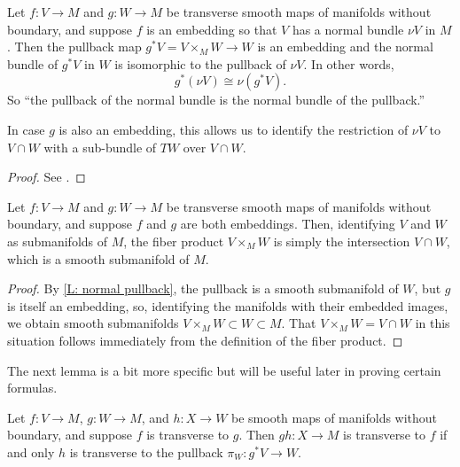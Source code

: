 \begin{lemma}\label{L: normal pullback}
	Let $f \colon V \to M$ and $g \colon W \to M$ be transverse smooth maps of manifolds without boundary, and suppose $f$ is an embedding so that $V$ has a normal bundle $\nu V$ in $M$.
	Then the pullback map $g^*V = V \times _MW \to W$ is an embedding and the normal bundle of $g^*V$ in $W$ is isomorphic to the pullback of $\nu V$.
	In other words,
	$$g^*(\nu V) \cong \nu(g^*V).$$
	So ``the pullback of the normal bundle is the normal bundle of the pullback.''

	In case $g$ is also an embedding, this allows us to identify the restriction of $\nu V$ to $V \cap W$ with a sub-bundle of $TW$ over $V \cap W$.
\end{lemma}

\begin{proof}
	See \cite[Proposition IV.1.4]{Kos93}.
\end{proof}

\begin{lemma}
	Let $f \colon V \to M$ and $g \colon W \to M$ be transverse smooth maps of manifolds without boundary, and suppose $f$ and $g$ are both embeddings.
	Then, identifying $V$ and $W$ as submanifolds of $M$, the fiber product $V \times _MW$ is simply the intersection $V \cap W$, which is a smooth submanifold of $M$.
\end{lemma}

\begin{proof}
	By \cref{L: normal pullback}, the pullback is a smooth submanifold of $W$, but $g$ is itself an embedding, so, identifying the manifolds with their embedded images, we obtain smooth submanifolds $V \times _MW \subset W \subset M$.
	That $V \times _MW = V \cap W$ in this situation follows immediately from the definition of the fiber product.
\end{proof}

The next lemma is a bit more specific but will be useful later in proving certain formulas.

\begin{lemma}\label{L: transverse to pullback}
	Let $f \colon V \to M$, $g \colon W \to M$, and $h \colon X \to W$ be smooth maps of manifolds without boundary, and suppose $f$ is transverse to $g$.
	Then $gh \colon X \to M$ is transverse to $f$ if and only $h$ is transverse to the pullback $\pi_W \colon g^*V \to W$.
\end{lemma}

